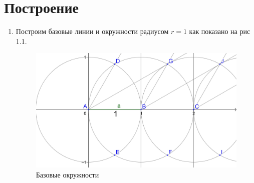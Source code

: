 \documentclass[12pt, letterpaper, oneside]{report}
\begin{document}
\section{Построение}
\begin{enumerate}
	\item Построим базовые линии и окружности радиусом $r=1$ как показано на рис 1.1.
\begin{figure}[H]
	\centerline{\includegraphics[scale=0.1]{img/basic.jpg}}
	\caption{Базовые окружности}
	\label{fig:basic}
\end{figure}
	

\end{enumerate}
\end{document}
